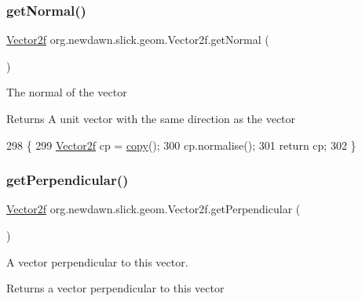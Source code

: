 \subsubsection{\texorpdfstring{get\+Normal()}{getNormal()}}
{\footnotesize\ttfamily \mbox{\hyperlink{classorg_1_1newdawn_1_1slick_1_1geom_1_1_vector2f}{Vector2f}} org.\+newdawn.\+slick.\+geom.\+Vector2f.\+get\+Normal (\begin{DoxyParamCaption}{ }\end{DoxyParamCaption})\hspace{0.3cm}{\ttfamily [inline]}}

The normal of the vector

\begin{DoxyReturn}{Returns}
A unit vector with the same direction as the vector 
\end{DoxyReturn}

\begin{DoxyCode}
298                                 \{
299        \mbox{\hyperlink{classorg_1_1newdawn_1_1slick_1_1geom_1_1_vector2f_a3b8e9eda9c9203462324bf4bc8e42153}{Vector2f}} cp = \mbox{\hyperlink{classorg_1_1newdawn_1_1slick_1_1geom_1_1_vector2f_a3f38eacefe225aef76d800a07267db32}{copy}}();
300        cp.normalise();
301        \textcolor{keywordflow}{return} cp;
302     \} 
\end{DoxyCode}
\mbox{\label{classorg_1_1newdawn_1_1slick_1_1geom_1_1_vector2f_a06f9304f8c4fb20c9f6e7f775a00f965}} 
\subsubsection{\texorpdfstring{get\+Perpendicular()}{getPerpendicular()}}
{\footnotesize\ttfamily \mbox{\hyperlink{classorg_1_1newdawn_1_1slick_1_1geom_1_1_vector2f}{Vector2f}} org.\+newdawn.\+slick.\+geom.\+Vector2f.\+get\+Perpendicular (\begin{DoxyParamCaption}{ }\end{DoxyParamCaption})\hspace{0.3cm}{\ttfamily [inline]}}

A vector perpendicular to this vector.

\begin{DoxyReturn}{Returns}
a vector perpendicular to this vector 
\end{DoxyReturn}

